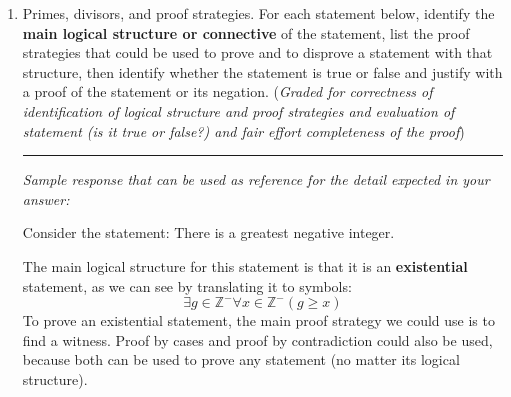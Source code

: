 \begin{enumerate}[labelindent=0pt, leftmargin=0pt]
    In this question, we'll consider the combination of these functions with a new function, one 
    that removes the element at the front of the list (if there is any). We define $remove: L \to L$
    by
    \[
        \begin{array}{ll}
            \textrm{Basis Step: } & remove([]) = [] \\
            \textrm{Recursive Step: } & \textrm{If } l \in L\textrm{ and }n \in \mathbb{N} \textrm{, then } remove(~(n, l)~) = l
        \end{array}        
    \]
    \begin{enumerate}
        \item What is the result of $remove(~append(~(prepend~(~(~(10,[]), 5~)~), 20)~)~)$? 
        For full credit, include all intermediate steps with brief justifications for each.
        \item Prove the statement
        \[
            \forall l \in L \left(~ remove( prepend(~(l,0)~)) = l ~\right) 
        \]
        \item Disprove the statement
        \[
            \forall l \in L \left(~ remove( append(~(l,0)~)) = l ~\right) 
        \]
    \end{enumerate}

    \item Primes, divisors, and proof strategies. For each statement below, identify the {\bf main logical structure or connective} of the 
    statement, list the proof strategies that could be used to prove and to disprove a statement with that structure, 
    then identify whether the statement is true or false and justify with a proof of the statement or its negation. 
    ({\it Graded for correctness of identification of logical structure and proof strategies and evaluation of statement (is it true or false?) 
    and fair effort completeness of the proof}) 


    \rule{0.5\textwidth}{.4pt}
    
    {\it Sample response that can be used as reference for the detail expected 
    in your answer:} 

    Consider the statement: There is a greatest negative integer.

    The main logical structure for this statement is that it is an {\bf existential} statement, as we can 
    see by translating it to symbols: 
    \[
        \exists g \in \mathbb{Z}^{-} \forall x \in \mathbb{Z}^{-} ( g \geq x)
    \]
    To prove an existential statement, the main proof strategy we could use is to find a witness. 
    Proof by cases and proof by contradiction could also be used, because 
    both can be used to prove any statement (no matter its logical structure).


\end{enumerate}
